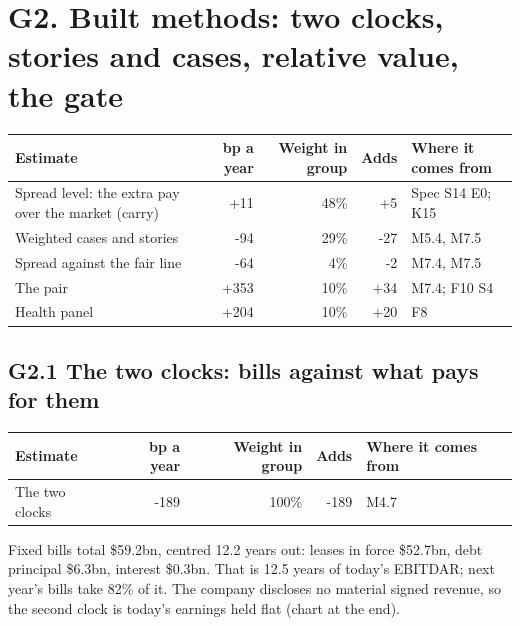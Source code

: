 \documentclass[11pt,a4paper]{article}
\begin{document}
\section*{G2. Built methods: two clocks, stories and cases, relative value, the gate}
\par\noindent{}
\begin{center}\footnotesize\setlength{\tabcolsep}{3.5pt}\begin{tabular}{@{}p{6.2cm}rrrp{4.2cm}@{}}\toprule
Estimate & bp a year & Weight in group & Adds & Where it comes from \\\midrule
Spread level: the extra pay over the market (carry) & +11 & 48\% & +5 & Spec S14 E0; K15 \\
Weighted cases and stories & -94 & 29\% & -27 & M5.4, M7.5 \\
Spread against the fair line & -64 & 4\% & -2 & M7.4, M7.5 \\
The pair & +353 & 10\% & +34 & M7.4; F10 S4 \\
Health panel & +204 & 10\% & +20 & F8 \\
\bottomrule\end{tabular}\end{center}
\subsection*{G2.1 The two clocks: bills against what pays for them}
\par\noindent{}
\begin{center}\footnotesize\setlength{\tabcolsep}{3.5pt}\begin{tabular}{@{}p{6.2cm}rrrp{4.2cm}@{}}\toprule
Estimate & bp a year & Weight in group & Adds & Where it comes from \\\midrule
The two clocks & -189 & 100\% & -189 & M4.7 \\
\bottomrule\end{tabular}\end{center}
Fixed bills total \$59.2bn, centred 12.2 years out: leases in force \$52.7bn, debt principal \$6.3bn, interest \$0.3bn. That is 12.5 years of today's EBITDAR; next year's bills take 82\% of it.
The company discloses no material signed revenue, so the second clock is today's earnings held flat (chart at the end).
\end{document}
